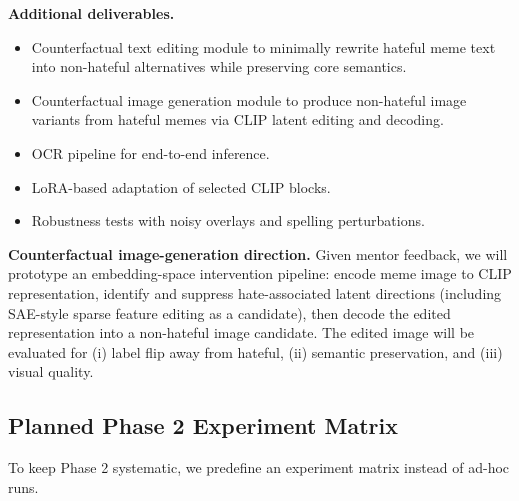 \documentclass[11pt]{article}
\begin{document}
\textbf{Additional deliverables.}
\begin{itemize}[leftmargin=*,nosep]
  \item Counterfactual text editing module to minimally rewrite hateful meme text into non-hateful alternatives while preserving core semantics.
  \item Counterfactual image generation module to produce non-hateful image variants from hateful memes via CLIP latent editing and decoding.
  \item OCR pipeline for end-to-end inference.
  \item LoRA-based adaptation of selected CLIP blocks.
  \item Robustness tests with noisy overlays and spelling perturbations.
\end{itemize}

\textbf{Counterfactual image-generation direction.}
Given mentor feedback, we will prototype an embedding-space intervention pipeline: encode meme image to CLIP representation, identify and suppress hate-associated latent directions (including SAE-style sparse feature editing as a candidate), then decode the edited representation into a non-hateful image candidate. The edited image will be evaluated for (i) label flip away from hateful, (ii) semantic preservation, and (iii) visual quality.

\subsection{Planned Phase 2 Experiment Matrix}
To keep Phase 2 systematic, we predefine an experiment matrix instead of ad-hoc runs.
\end{document}
